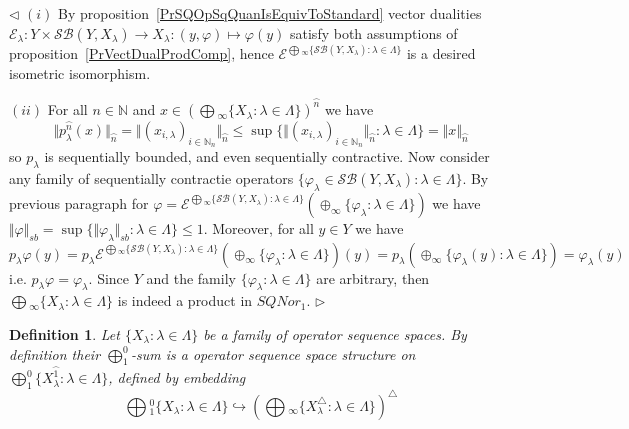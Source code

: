 \documentclass[12pt]{article}
\newtheorem{definition}[theorem]{Definition}
\newenvironment{proof}{\par $\triangleleft$}{$\triangleright$}
\begin{document}
\begin{proof} $(i)$ By proposition~\ref{PrSQOpSqQuanIsEquivToStandard} vector 
dualities 
$\mathcal{E}_\lambda
:Y\times\mathcal{SB}(Y,X_\lambda)\to X_\lambda:(y,\varphi)\mapsto \varphi(y)$ 
satisfy both assumptions of proposition~\ref{PrVectDualProdComp}, hence 
$\mathcal{E}^{\bigoplus{}_\infty \{\mathcal{SB}(Y,X_\lambda)
:\lambda\in\Lambda \}}$ 
is a desired isometric isomorphism.

$(ii)$ For all $n\in\mathbb{N}$ and 
$x\in {\left(
    \bigoplus{}_\infty \{X_\lambda:\lambda\in\Lambda \}
\right)}^{\wideparen{n}}$ we have
$$
\Vert p_\lambda^{\wideparen{n}}(x)\Vert_{\wideparen{n}} 
=\Vert
    {(x_{i,\lambda})}_{i\in\mathbb{N}_n}
\Vert_{\wideparen{n}} 
\leq\sup \{
    \Vert
        {(x_{i,\lambda})}_{i\in\mathbb{N}_n}
    \Vert_{\wideparen{n}}
    :\lambda\in \Lambda 
 \}
=\Vert x\Vert_{\wideparen{n}}
$$
so $p_\lambda$ is sequentially bounded, and even sequentially contractive. 
Now consider any family of sequentially contractie operators 
$ \{\varphi_\lambda\in\mathcal{SB}(Y,X_\lambda):\lambda\in\Lambda \}$. 
By previous paragraph for  
$\varphi
=\mathcal{E}^{\bigoplus{}_\infty \{
    \mathcal{SB}(Y,X_\lambda):\lambda\in\Lambda 
 \}}
(\oplus_\infty \{\varphi_\lambda:\lambda\in\Lambda \})$ we have 
$\Vert\varphi\Vert_{sb}
=\sup \{\Vert\varphi_\lambda\Vert_{sb}:\lambda\in\Lambda \}\leq 1$. 
Moreover, for all $y\in Y$ we have
$$
p_\lambda\varphi(y)
=p_\lambda\mathcal{E}^{\bigoplus{}_\infty \{
    \mathcal{SB}(Y,X_\lambda):\lambda\in\Lambda
 \}}(\oplus_\infty \{\varphi_\lambda:\lambda\in\Lambda \})(y)
=p_\lambda(\oplus_\infty \{\varphi_\lambda(y):\lambda\in\Lambda \})
=\varphi_\lambda(y)
$$
i.e. $p_\lambda\varphi=\varphi_\lambda$. Since $Y$ and the family 
$ \{\varphi_\lambda:\lambda\in\Lambda \}$ are arbitrary, then 
$\bigoplus{}_\infty \{X_\lambda:\lambda\in\Lambda \}$ is indeed a 
product in $SQNor_1$.
\end{proof}

\begin{definition}\label{DefSQCoProd}
Let $ \{X_\lambda: \lambda \in \Lambda \}$ be a family of operator sequence 
spaces. By definition their $\bigoplus_1^0$-sum is a operator sequence space 
structure on  
$\bigoplus_1^0 \{X_\lambda^{\wideparen{1}}:\lambda\in \Lambda \}$, defined 
by embedding
$$
\bigoplus{}_1^0 \{X_\lambda:\lambda \in \Lambda \}\hookrightarrow
{\left(\bigoplus{}_\infty \{X_\lambda^\triangle:\lambda\in
\Lambda \}\right)}^\triangle
$$
\end{definition}
\end{document}
